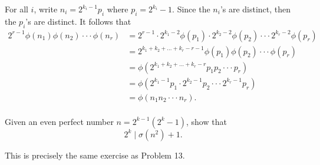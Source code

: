 \begin{solution}
    For all $i$, write $n_i = 2^{k_i - 1}p_i$ where $p_i = 2^{k_i} - 1$. Since the $n_i$'s are distinct, then the $p_i$'s are distinct. It follows that
    \begin{align*}
        2^{r-1}\phi(n_1)\phi(n_2)\cdot \cdot \cdot \phi(n_r)&= 2^{r-1}\cdot 2^{k_1 - 2}\phi(p_1)\cdot 2^{k_2 - 2}\phi(p_2) \cdot \cdot \cdot 2^{k_r - 2}\phi(p_r) \\
        &= 2^{k_1 + k_2 + \dots + k_r - r - 1}\phi(p_1)\phi(p_2)\cdot \cdot \cdot \phi(p_r) \\
        &= \phi(2^{k_1 + k_2 + \dots + k_r - r}p_1 p_2\cdot \cdot \cdot p_r) \\
        &= \phi(2^{k_1 -1}p_1\cdot 2^{k_2 - 1} p_2\cdot \cdot \cdot 2^{k_r - 1}p_r) \\
        &= \phi(n_1n_2 \cdot \cdot \cdot n_r).\\
    \end{align*}
\end{solution}

\begin{exercise}
    Given an even perfect number $n = 2^{k-1}(2^k - 1)$, show that
    $$2^k \mid \sigma(n^2) + 1.$$ 
\end{exercise}

\begin{solution}
    This is precisely the same exercise as Problem 13.
\end{solution}

